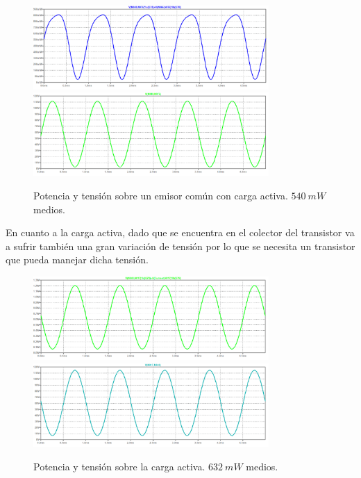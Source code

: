 \begin{figure}[H]
	\centering
	\includegraphics[width=0.8\textwidth]{ImagenesSimulaciones/PECF.png}
		\includegraphics[width=0.8\textwidth]{ImagenesSimulaciones/VECF.png}
	\caption{Potencia y tensión sobre un emisor común con carga activa. $540 \ mW$ medios.}
	\label{fig:pecf}
\end{figure}
En cuanto a la carga activa, dado que se encuentra en el colector del transistor va a  sufrir también una gran variación de tensión por lo que se necesita un transistor que pueda manejar dicha tensión.
\begin{figure}[H]
	\centering
	\includegraphics[width=0.8\textwidth]{ImagenesSimulaciones/PCSEC.png}
		\includegraphics[width=0.8\textwidth]{ImagenesSimulaciones/VCSEC.png}
	\caption{Potencia y tensión sobre la carga activa. $632 \ mW$ medios.}
	\label{fig:pcsecf}
\end{figure}

